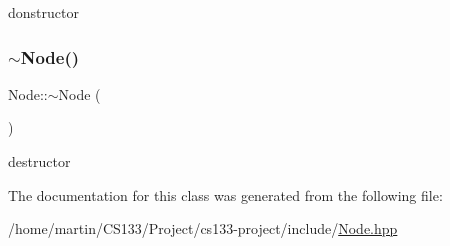 donstructor 

\mbox{\label{class_node_aa0840c3cb5c7159be6d992adecd2097c}} 
\subsubsection{\texorpdfstring{$\sim$\+Node()}{~Node()}}
{\footnotesize\ttfamily Node\+::$\sim$\+Node (\begin{DoxyParamCaption}{ }\end{DoxyParamCaption})}



destructor 



The documentation for this class was generated from the following file\+:\begin{DoxyCompactItemize}
\item 
/home/martin/\+C\+S133/\+Project/cs133-\/project/include/\hyperlink{_node_8hpp}{Node.\+hpp}\end{DoxyCompactItemize}
